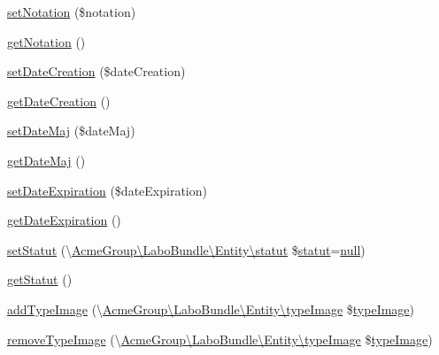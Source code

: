 \begin{DoxyCompactItemize}
\item 
\hyperlink{class_acme_group_1_1_labo_bundle_1_1_entity_1_1image_a76681169c1b42de5bb5a0c668e77252f}{set\+Notation} (\$notation)
\item 
\hyperlink{class_acme_group_1_1_labo_bundle_1_1_entity_1_1image_ad82f1357cd1d3cf5a4dfed97a41cc436}{get\+Notation} ()
\item 
\hyperlink{class_acme_group_1_1_labo_bundle_1_1_entity_1_1image_a93602b36255ff9d99266699de1bb010e}{set\+Date\+Creation} (\$date\+Creation)
\item 
\hyperlink{class_acme_group_1_1_labo_bundle_1_1_entity_1_1image_ad9ebb8e09256f11b577d7af8f51d8825}{get\+Date\+Creation} ()
\item 
\hyperlink{class_acme_group_1_1_labo_bundle_1_1_entity_1_1image_af11077b3b21a8f731d344d77c3d7d04b}{set\+Date\+Maj} (\$date\+Maj)
\item 
\hyperlink{class_acme_group_1_1_labo_bundle_1_1_entity_1_1image_ae3d0d5dc16ffef52794b103df6b99139}{get\+Date\+Maj} ()
\item 
\hyperlink{class_acme_group_1_1_labo_bundle_1_1_entity_1_1image_a1d0744e18b1260422bde4ebe63f43ffb}{set\+Date\+Expiration} (\$date\+Expiration)
\item 
\hyperlink{class_acme_group_1_1_labo_bundle_1_1_entity_1_1image_a73122f8aa76e8069c11a3147d1ab8f42}{get\+Date\+Expiration} ()
\item 
\hyperlink{class_acme_group_1_1_labo_bundle_1_1_entity_1_1image_abe346cb46dd2b0c153a92d9aac133bb5}{set\+Statut} (\textbackslash{}\hyperlink{class_acme_group_1_1_labo_bundle_1_1_entity_1_1statut}{Acme\+Group\textbackslash{}\+Labo\+Bundle\textbackslash{}\+Entity\textbackslash{}statut} \$\hyperlink{class_acme_group_1_1_labo_bundle_1_1_entity_1_1statut}{statut}=\hyperlink{validate_8js_afb8e110345c45e74478894341ab6b28e}{null})
\item 
\hyperlink{class_acme_group_1_1_labo_bundle_1_1_entity_1_1image_aef47eb955b45a1d4b24f53a6eacba028}{get\+Statut} ()
\item 
\hyperlink{class_acme_group_1_1_labo_bundle_1_1_entity_1_1image_af971813de4a33cb53cd2d21841dd2530}{add\+Type\+Image} (\textbackslash{}\hyperlink{class_acme_group_1_1_labo_bundle_1_1_entity_1_1type_image}{Acme\+Group\textbackslash{}\+Labo\+Bundle\textbackslash{}\+Entity\textbackslash{}type\+Image} \$\hyperlink{class_acme_group_1_1_labo_bundle_1_1_entity_1_1type_image}{type\+Image})
\item 
\hyperlink{class_acme_group_1_1_labo_bundle_1_1_entity_1_1image_a8e4def444c439e0aa480db749730d156}{remove\+Type\+Image} (\textbackslash{}\hyperlink{class_acme_group_1_1_labo_bundle_1_1_entity_1_1type_image}{Acme\+Group\textbackslash{}\+Labo\+Bundle\textbackslash{}\+Entity\textbackslash{}type\+Image} \$\hyperlink{class_acme_group_1_1_labo_bundle_1_1_entity_1_1type_image}{type\+Image})

\end{DoxyCompactItemize}
